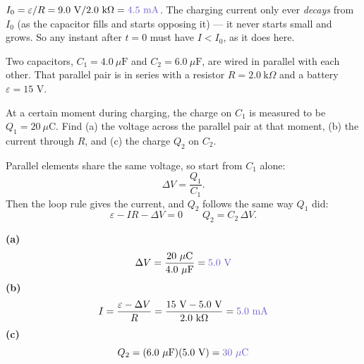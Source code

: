 \documentclass[12pt]{article}
\newcommand{\ANS}[1]{\textcolor{accent}{#1}}
\newcommand{\battv}[1]{%
  \draw[line width=0.7pt] ($(#1)+(0,0.55)$) -- ($(#1)+(0,0.12)$);
  \draw[line width=0.7pt] ($(#1)+(0,-0.12)$) -- ($(#1)+(0,-0.55)$);
  \draw[line width=1.1pt] ($(#1)+(-0.35,0.12)$) -- ($(#1)+(0.35,0.12)$);
  \draw[line width=2.4pt] ($(#1)+(-0.2,-0.12)$) -- ($(#1)+(0.2,-0.12)$);
  \node[scale=0.75] at ($(#1)+(0.6,0.12)$) {$+$};
  \node[scale=0.75] at ($(#1)+(0.6,-0.12)$) {$-$};
}
\newcommand{\reszig}[1]{%
  \fill[white] ($(#1)+(-0.65,-0.32)$) rectangle ($(#1)+(0.65,0.32)$);
  \draw ($(#1)+(-0.6,0)$)
    -- ($(#1)+(-0.42,0.22)$) -- ($(#1)+(-0.24,-0.22)$)
    -- ($(#1)+(-0.06,0.22)$) -- ($(#1)+(0.12,-0.22)$)
    -- ($(#1)+(0.3,0.22)$) -- ($(#1)+(0.48,-0.22)$)
    -- ($(#1)+(0.6,0)$);
}
\newcommand{\capsym}[1]{%
  \fill[white] ($(#1)+(-0.35,-0.4)$) rectangle ($(#1)+(0.35,0.4)$);
  \draw[line width=0.7pt] ($(#1)+(-0.35,0)$) -- ($(#1)+(-0.1,0)$);
  \draw[line width=0.7pt] ($(#1)+(0.1,0)$) -- ($(#1)+(0.35,0)$);
  \draw[line width=1.8pt] ($(#1)+(-0.1,-0.3)$) -- ($(#1)+(-0.1,0.3)$);
  \draw[line width=1.8pt] ($(#1)+(0.1,-0.3)$) -- ($(#1)+(0.1,0.3)$);
}
\begin{document}

{\small\color{accent} $I_0=\varepsilon/R=9.0\text{ V}/2.0\ \text{k}\Omega=
\ANS{4.5\text{ mA}}$. The charging current only ever \emph{decays} from
$I_0$ (as the capacitor fills and starts opposing it) --- it never starts
small and grows. So any instant after $t=0$ must have $I<I_0$, as it does
here.}


Two capacitors, $C_1=4.0\ \mu\text{F}$ and $C_2=6.0\ \mu\text{F}$, are
wired in parallel with each other. That parallel pair is in series with a
resistor $R=2.0\ \text{k}\Omega$ and a battery $\varepsilon=15$ V.

\begin{center}
\end{center}

At a certain moment during charging, the charge on $C_1$ is measured to be
$Q_1=20\ \mu\text{C}$. Find (a) the voltage across the parallel pair at
that moment, (b) the current through $R$, and (c) the charge $Q_2$ on
$C_2$.

{\small
Parallel elements share the same voltage, so start from $C_1$ alone:
\[
\Delta V = \dfrac{Q_1}{C_1}.
\]
Then the loop rule gives the current, and $Q_2$ follows the same way $Q_1$
did:
\[
\varepsilon - IR - \Delta V = 0 \qquad Q_2 = C_2\,\Delta V.
\]}

\textbf{(a)}
\[
\Delta V = \dfrac{20\ \mu\text{C}}{4.0\ \mu\text{F}} = \ANS{5.0\text{ V}}
\]
\textbf{(b)}
\[
I = \dfrac{\varepsilon - \Delta V}{R} = \dfrac{15\text{ V}-5.0\text{ V}}{2.0\ \text{k}\Omega}
= \ANS{5.0\text{ mA}}
\]
\textbf{(c)}
\[
Q_2 = (6.0\ \mu\text{F})(5.0\text{ V}) = \ANS{30\ \mu\text{C}}
\]
\end{document}
